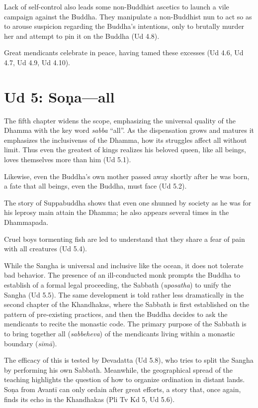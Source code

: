 \documentclass[12pt,openany]{book}%
\begin{document}
Lack of self-control also leads some non-Buddhist ascetics to launch a vile campaign against the Buddha. They manipulate a non-Buddhist nun to act so as to arouse suspicion regarding the Buddha’s intentions, only to brutally murder her and attempt to pin it on the Buddha (Ud 4.8). 

Great mendicants celebrate in peace, having tamed these excesses (Ud 4.6, Ud 4.7, Ud 4.9, Ud 4.10).

\section*{Ud 5: \textsanskrit{Soṇa}—all}

The fifth chapter widens the scope, emphasizing the universal quality of the Dhamma with the key word \textit{sabba} “all”. As the dispensation grows and matures it emphasizes the inclusivenss of the Dhamma, how its struggles affect all without limit. Thus even the greatest of kings realizes his beloved queen, like all beings, loves themselves more than him (Ud 5.1). 

Likewise, even the Buddha’s own mother passed away shortly after he was born, a fate that all beings, even the Buddha, must face (Ud 5.2). 

The story of Suppabuddha shows that even one shunned by society as he was for his leprosy main attain the Dhamma; he also appears several times in the Dhammapada.

 Cruel boys tormenting fish are led to understand that they share a fear of pain with all creatures (Ud 5.4). 

 While the Sangha is universal and inclusive like the ocean, it does not tolerate bad behavior. The presence of an ill-conducted monk prompts the Buddha to establish of a formal legal proceeding, the Sabbath (\textit{uposatha}) to unify the Sangha (Ud 5.5). The same development is told rather less dramatically in the second chapter of the Khandhakas, where the Sabbath is first established on the pattern of pre-existing practices, and then the Buddha decides to ask the mendicants to recite the monastic code. The primary purpose of the Sabbath is to bring together all (\textit{sabbeheva}) of the mendicants living within a monastic boundary (\textit{\textsanskrit{sīmā}}). 

 The efficacy of this is tested by Devadatta (Ud 5.8), who tries to split the Sangha by performing his own Sabbath. Meanwhile, the geographical spread of the teaching highlights the question of how to organize ordination in distant lands. \textsanskrit{Soṇa} from \textsanskrit{Avantī} can only ordain after great efforts, a story that, once again, finds its echo in the Khandhakas (Pli Tv Kd 5, Ud 5.6). 
\end{document}
